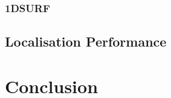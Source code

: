 \documentclass{article}
\begin{document}
\subsubsection{1DSURF}
\label{sec:1dsurfResults}


\subsection{Localisation Performance}
\label{sec:localisationPerformance}







\section{Conclusion}
\label{sec:conclusion}

%
%
%
%
 
\end{document}
